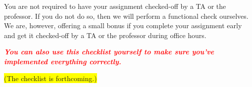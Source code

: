 You are not required to have your assignment checked-off by a TA or the professor.
If you do not do so, then we will perform a functional check ourselves.
We are, however, offering a small bonus if you complete your assignment early and get it checked-off by a TA or the professor during office hours.

\textcolor{red}{\textbf{\textit{You can also use this checklist yourself to make sure you've implemented everything correctly.}}}

\colorbox{yellow}{(The checklist is forthcoming.)}

%
